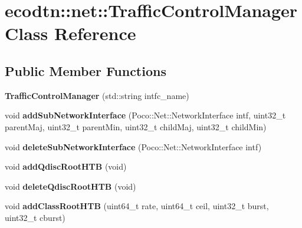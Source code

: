 \hypertarget{classecodtn_1_1net_1_1TrafficControlManager}{}\section{ecodtn\+:\+:net\+:\+:Traffic\+Control\+Manager Class Reference}
\label{classecodtn_1_1net_1_1TrafficControlManager}
\subsection*{Public Member Functions}
\begin{DoxyCompactItemize}
\item 
\mbox{\label{classecodtn_1_1net_1_1TrafficControlManager_aaeddbdab5efbc664edd163f8158fe69f}} 
{\bfseries Traffic\+Control\+Manager} (std\+::string intfc\+\_\+name)
\item 
\mbox{\label{classecodtn_1_1net_1_1TrafficControlManager_ad8a9f1042bb6612d0837e48ac51ae0de}} 
void {\bfseries add\+Sub\+Network\+Interface} (Poco\+::\+Net\+::\+Network\+Interface intf, uint32\+\_\+t parent\+Maj, uint32\+\_\+t parent\+Min, uint32\+\_\+t child\+Maj, uint32\+\_\+t child\+Min)
\item 
\mbox{\label{classecodtn_1_1net_1_1TrafficControlManager_ac58245ce8bcb88d86c638881e857147d}} 
void {\bfseries delete\+Sub\+Network\+Interface} (Poco\+::\+Net\+::\+Network\+Interface intf)
\item 
\mbox{\label{classecodtn_1_1net_1_1TrafficControlManager_a713beb350e2b2ea9d0e7ce2010443f9e}} 
void {\bfseries add\+Qdisc\+Root\+H\+TB} (void)
\item 
\mbox{\label{classecodtn_1_1net_1_1TrafficControlManager_a16ac6a43fcdd374ab3aff22f62c778c7}} 
void {\bfseries delete\+Qdisc\+Root\+H\+TB} (void)
\item 
\mbox{\label{classecodtn_1_1net_1_1TrafficControlManager_a023dc5dabeba55b2071cc0bfc6d53cfc}} 
void {\bfseries add\+Class\+Root\+H\+TB} (uint64\+\_\+t rate, uint64\+\_\+t ceil, uint32\+\_\+t burst, uint32\+\_\+t cburst)

\end{DoxyCompactItemize}
